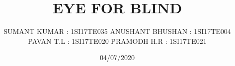 \title{EYE FOR BLIND}
\author{SUMANT KUMAR : 1SI17TE035 \break ANUSHANT BHUSHAN : 1SI17TE004 \break PAVAN T.L : 1SI17TE020 \break PRAMODH H.R : 1SI17TE021}
\date{04/07/2020}
\maketitle